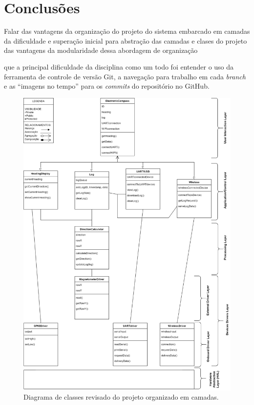 \documentclass[10pt,twocolumn,letterpaper]{article}
\begin{document}
\section{Conclusões}
Falar 
das vantagens da organização do projeto do sistema embarcado em camadas
da dificuldade e superação inicial para abstração das camadas e clases do projeto
das vantagens da modularidade dessa abordagem de organização

que a principal dificuldade da disciplina como um todo foi entender o uso da ferramenta de 
controle de versão Git, a navegação para trabalho em cada \emph{branch} e as ``imagens no tempo''
para os \emph{commits} do repositório no GitHub.


\onecolumn
{}
\label{apendice-a}
\begin{figure}[h]
  \centering
  \includegraphics[keepaspectratio=true,scale=0.53]{figures/Diagrama_Classe_Projeto_Final_rev2.png}
  \caption{Diagrama de classes revisado do projeto organizado em camadas.}
  \label{fig:diagrama-classes}
\end{figure}
\end{document}
